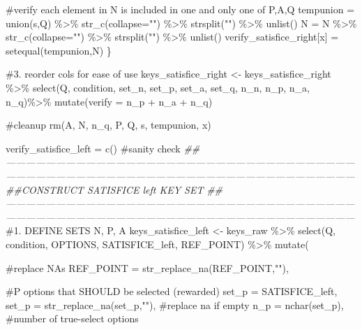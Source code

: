 \documentclass[
  letterpaper,
  DIV=11,
  numbers=noendperiod]{scrreprt}
\newenvironment{Shaded}{\begin{snugshade}}{\end{snugshade}}
\newcommand{\AttributeTok}[1]{\textcolor[rgb]{0.40,0.45,0.13}{#1}}
\newcommand{\CommentTok}[1]{\textcolor[rgb]{0.37,0.37,0.37}{#1}}
\newcommand{\DocumentationTok}[1]{\textcolor[rgb]{0.37,0.37,0.37}{\textit{#1}}}
\newcommand{\FunctionTok}[1]{\textcolor[rgb]{0.28,0.35,0.67}{#1}}
\newcommand{\NormalTok}[1]{\textcolor[rgb]{0.00,0.23,0.31}{#1}}
\newcommand{\OtherTok}[1]{\textcolor[rgb]{0.00,0.23,0.31}{#1}}
\newcommand{\SpecialCharTok}[1]{\textcolor[rgb]{0.37,0.37,0.37}{#1}}
\newcommand{\StringTok}[1]{\textcolor[rgb]{0.13,0.47,0.30}{#1}}
\begin{document}
\begin{Shaded}
\begin{Highlighting}[]
  \CommentTok{\#verify each element in N is included in one and only one of P,A,Q}
\NormalTok{  tempunion }\OtherTok{=} \FunctionTok{union}\NormalTok{(s,Q) }\SpecialCharTok{\%\textgreater{}\%} \FunctionTok{str\_c}\NormalTok{(}\AttributeTok{collapse=}\StringTok{""}\NormalTok{) }\SpecialCharTok{\%\textgreater{}\%} \FunctionTok{strsplit}\NormalTok{(}\StringTok{""}\NormalTok{) }\SpecialCharTok{\%\textgreater{}\%} \FunctionTok{unlist}\NormalTok{()}
\NormalTok{  N }\OtherTok{=}\NormalTok{ N }\SpecialCharTok{\%\textgreater{}\%} \FunctionTok{str\_c}\NormalTok{(}\AttributeTok{collapse=}\StringTok{""}\NormalTok{) }\SpecialCharTok{\%\textgreater{}\%} \FunctionTok{strsplit}\NormalTok{(}\StringTok{""}\NormalTok{) }\SpecialCharTok{\%\textgreater{}\%} \FunctionTok{unlist}\NormalTok{()}
\NormalTok{  verify\_satisfice\_right[x] }\OtherTok{=} \FunctionTok{setequal}\NormalTok{(tempunion,N)}
\NormalTok{\}}

\CommentTok{\#3. reorder cols for ease of use}
\NormalTok{keys\_satisfice\_right }\OtherTok{\textless{}{-}}\NormalTok{ keys\_satisfice\_right }\SpecialCharTok{\%\textgreater{}\%} \FunctionTok{select}\NormalTok{(Q, condition, set\_n, set\_p, set\_a, set\_q, n\_n, n\_p, n\_a, n\_q)}\SpecialCharTok{\%\textgreater{}\%} \FunctionTok{mutate}\NormalTok{(}\AttributeTok{verify =}\NormalTok{ n\_p }\SpecialCharTok{+}\NormalTok{ n\_a }\SpecialCharTok{+}\NormalTok{ n\_q)}


\CommentTok{\#cleanup}
\FunctionTok{rm}\NormalTok{(A, N, n\_q, P, Q, s, tempunion, x)}



\NormalTok{verify\_satisfice\_left }\OtherTok{=} \FunctionTok{c}\NormalTok{() }\CommentTok{\#sanity check}
\DocumentationTok{\#\#——————————————————————————————————————————————————————————————————————}
\DocumentationTok{\#\#CONSTRUCT SATISFICE left KEY SET}
\DocumentationTok{\#\#——————————————————————————————————————————————————————————————————————}
\CommentTok{\#1. DEFINE SETS N, P, A}
\NormalTok{keys\_satisfice\_left }\OtherTok{\textless{}{-}}\NormalTok{ keys\_raw }\SpecialCharTok{\%\textgreater{}\%} 
  \FunctionTok{select}\NormalTok{(Q, condition, OPTIONS, SATISFICE\_left, REF\_POINT) }\SpecialCharTok{\%\textgreater{}\%} 
  \FunctionTok{mutate}\NormalTok{(}
    
    \CommentTok{\#replace NAs }
    \AttributeTok{REF\_POINT =} \FunctionTok{str\_replace\_na}\NormalTok{(REF\_POINT,}\StringTok{""}\NormalTok{),}
    
    \CommentTok{\#P options that SHOULD be selected (rewarded)}
    \AttributeTok{set\_p =}\NormalTok{ SATISFICE\_left,}
    \AttributeTok{set\_p =} \FunctionTok{str\_replace\_na}\NormalTok{(set\_p,}\StringTok{""}\NormalTok{), }\CommentTok{\#replace na if empty}
    \AttributeTok{n\_p =} \FunctionTok{nchar}\NormalTok{(set\_p), }\CommentTok{\#number of true{-}select options}
    

\end{Highlighting}
\end{Shaded}
\end{document}
